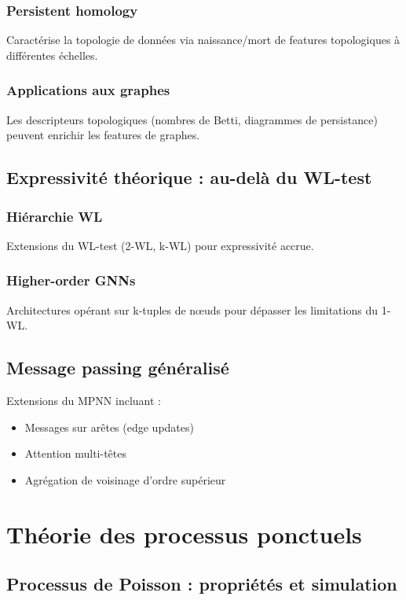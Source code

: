 \subsection{Persistent homology}
Caractérise la topologie de données via naissance/mort de features topologiques à différentes échelles.

\subsection{Applications aux graphes}
Les descripteurs topologiques (nombres de Betti, diagrammes de persistance) peuvent enrichir les features de graphes.

\section{Expressivité théorique : au-delà du WL-test}

\subsection{Hiérarchie WL}
Extensions du WL-test (2-WL, k-WL) pour expressivité accrue.

\subsection{Higher-order GNNs}
Architectures opérant sur k-tuples de nœuds pour dépasser les limitations du 1-WL.

\section{Message passing généralisé}

Extensions du MPNN incluant :
\begin{itemize}
    \item Messages sur arêtes (edge updates)
    \item Attention multi-têtes
    \item Agrégation de voisinage d'ordre supérieur
\end{itemize}

\chapter{Théorie des processus ponctuels}

\section{Processus de Poisson : propriétés et simulation}

